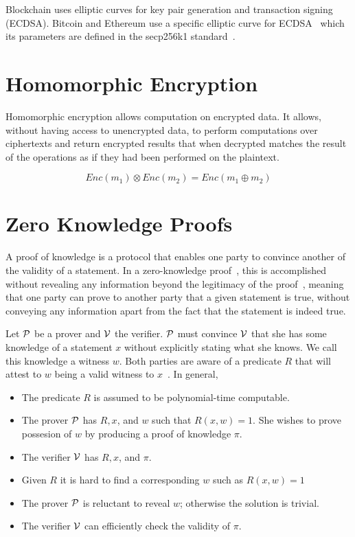Blockchain uses elliptic curves for key pair generation and transaction signing (ECDSA). Bitcoin and Ethereum use a specific elliptic curve for ECDSA~\cite{ecdsa} which its parameters are defined in the secp256k1 standard~\cite{secp}.

\section{Homomorphic Encryption}
\label{preliminaries:homo}

Homomorphic encryption allows computation on encrypted data. It allows, without having access to unencrypted data, to perform computations over ciphertexts and return encrypted results that when decrypted matches the result of the operations as if they had been performed on the plaintext.

\begin{equation*}
  Enc(m_1) \otimes Enc(m_2) = Enc(m_1 \oplus m_2)
\end{equation*}

\section{Zero Knowledge Proofs}
\label{zkp}

A proof of knowledge is a protocol that enables one party to convince another of the validity of a statement.
In a zero-knowledge proof~\cite{zkp}, this is accomplished without revealing any information beyond the legitimacy of the proof~\cite{kiagias:crypto},
meaning that one party can prove to another party that a given statement is true, without conveying any information apart from the fact that the statement is indeed true.

Let $\mathcal{P}$ be a prover and $\mathcal{V}$ the verifier. $\mathcal{P}$ must convince $\mathcal{V}$ that she has some
knowledge of a statement $x$ without explicitly stating what she knows. We call this knowledge a witness $w$.
Both parties are aware of a predicate $R$ that will attest to $w$ being a valid witness to $x$~\cite{kiagias:crypto}. In general,

\begin{itemize}
  \item The predicate $R$ is assumed to be polynomial-time computable.
  \item The prover $\mathcal{P}$ has $R,x$, and $w$ such that $R(x,w) = 1$. She wishes to prove possesion of $w$ by producing a proof of knowledge $\pi$.
  \item The verifier $\mathcal{V}$ has $R,x$, and $\pi$.
  \item Given $R$ it is hard to find a corresponding $w$ such as $R(x,w) = 1$
  \item The prover $\mathcal{P}$ is reluctant to reveal $w$; otherwise the solution is trivial.
  \item The verifier $\mathcal{V}$ can efficiently check the validity of $\pi$.
\end{itemize}

